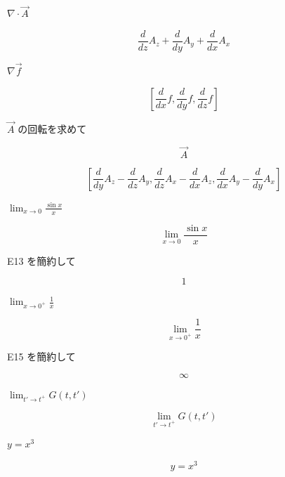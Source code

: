 \documentclass[dvipdfmx,a4paper,11pt]{jsarticle}
\begin{document}
$\nabla \cdot \vec{A}$

\begin{equation}
  \frac{d}{d z} A_{z}+\frac{d}{d y} A_{y}+\frac{d}{d x} A_{x}
  \label{eq:E9}
\end{equation}

$\nabla \vec{f}$

\begin{equation}
  \left[ \frac{d}{d x} f , \frac{d}{d y} f , \frac{d}{d z} f \right]
  \label{eq:E10}
\end{equation}

$\vec{A}$ の回転を求めて

\begin{equation}
  \vec{A}
  \label{eq:E11}
\end{equation}

\begin{equation}
  \left[ \frac{d}{d y} A_{z}-\frac{d}{d z} A_{y} , \frac{d}{d z} A_{x}-\frac{d}{d x} A_{z} , \frac{d}{d x} A_{y}-\frac{d}{d y} A_{x} \right]
  \label{eq:E12}
\end{equation}

$\lim_{x \to 0} \frac{\sin x}{x}$

\begin{equation}
  \lim_{x \to 0} \frac{\sin x}{x}
  \label{eq:E13}
\end{equation}

E13 を簡約して

\begin{equation}
  1
  \label{eq:E14}
\end{equation}

$\lim_{x \to 0^+} \frac{1}{x}$

\begin{equation}
  \lim_{x \to 0^+} \frac{1}{x}
  \label{eq:E15}
\end{equation}

E15 を簡約して

\begin{equation}
  \infty
  \label{eq:E16}
\end{equation}

$\lim_{t' \to t^+} G(t,t')$

\begin{equation}
  \lim_{t' \to t^+} G(t,t')
  \label{eq:E17}
\end{equation}

$y = x^3$

\begin{equation}
  y = x^3
  \label{eq:E18}
\end{equation}
\end{document}
